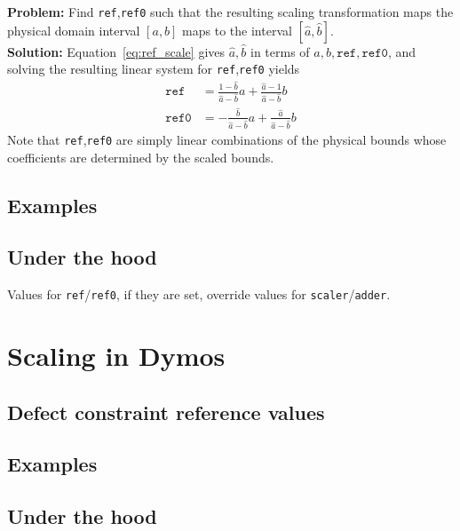 \documentclass{article}
\begin{document}
\noindent
\textbf{Problem:} Find \texttt{ref},\texttt{ref0} such that the resulting scaling transformation maps the physical domain interval $[a,b]$ maps to the interval $[\hat{a},\hat{b}]$. \\

\noindent
\textbf{Solution:} Equation~\eqref{eq:ref_scale} gives $\hat{a},\hat{b}$ in terms of $a,b,\texttt{ref},\texttt{ref0}$, and solving the resulting linear system for \texttt{ref},\texttt{ref0} yields
\begin{align*}
    \texttt{ref} &= \frac{1-\hat{b}}{\hat{a}-\hat{b}}a + \frac{\hat{a}-1}{\hat{a}-\hat{b}}b \\
    \texttt{ref0} &= -\frac{\hat{b}}{\hat{a}-\hat{b}}a + \frac{\hat{a}}{\hat{a}-\hat{b}}b
\end{align*}
Note that \texttt{ref},\texttt{ref0} are simply linear combinations of the physical bounds whose coefficients are determined by the scaled bounds.

\subsection*{Examples}

\subsection*{Under the hood}

\noindent
Values for \texttt{ref}/\texttt{ref0}, if they are set, override values for \texttt{scaler}/\texttt{adder}.

\newpage
\section{Scaling in Dymos}

\subsection*{Defect constraint reference values}

\subsection*{Examples}

\subsection*{Under the hood}
\end{document}
